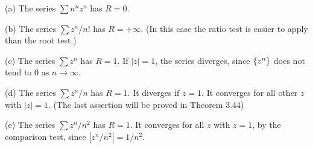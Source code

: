 \begin{myExample}
    (a) The series $\sum n^n z^n$ has $R = 0$.

    (b) The series $\sum z^n / n!$ has $R = +\infty$.
    (In this case the ratio test is easier to apply than the root test.)

    (c) The series $\sum z^n$ has $R = 1$.
    If $|z| = 1$, the series diverges, since $\protect\{z^n\}$ does not tend to $0$ as $n \rightarrow \infty $.

    (d) The series $\sum z^n / n$ has $R = 1$.
    It diverges if $z = 1$. It converges for all other $z$ with $|z|=1$.
    (The last assertion will be proved in Theorem 3.44)

    (e) The series $\sum z^n / n^2$ has $R = 1$.
    It converges for all $z$ with $z = 1$,
    by the comparison test, since $|z^n/n^2| = 1/n^2$.
\end{myExample}